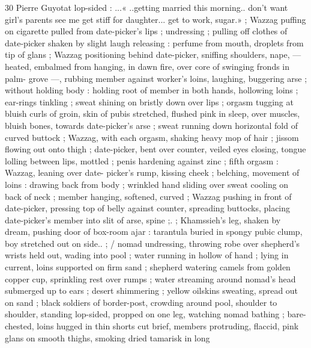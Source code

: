 30 Pierre Guyotat
lop-sided : ...« ..getting married this morning.. don’t want girl's
parents see me get stiff for daughter... get to work, sugar.» ; Wazzag
puffing on cigarette pulled from date-picker's lips ; undressing ;
pulling off clothes of date-picker shaken by slight laugh releasing :
perfume from mouth, droplets from tip of glans ; Wazzag positioning
behind date-picker, sniffing shoulders, nape, — heated, embalmed
from hanging, in dawn fire, over core of swinging fronds in palm-
grove —, rubbing member against worker's loins, laughing,
buggering arse ; without holding body : holding root of member in
both hands, hollowing loins ; ear-rings tinkling ; sweat shining on
bristly down over lips ; orgasm tugging at bluish curls of groin, skin
of pubis stretched, flushed pink in sleep, over muscles, bluish bones,
towards date-picker's arse ; sweat running down horizontal fold of
curved buttock ; Wazzag, with each orgasm, shaking heavy mop of
hair ; jissom flowing out onto thigh ; date-picker, bent over counter,
veiled eyes closing, tongue lolling between lips, mottled ; penis
hardening against zinc ; fifth orgasm : Wazzag, leaning over date-
picker's rump, kissing cheek ; belching, movement of loins : drawing
back from body ; wrinkled hand sliding over sweat cooling on back of
neck ; member hanging, softened, curved ; Wazzag pushing in front
of date-picker, pressing top of belly against counter, spreading
buttocks, placing date-picker's member into slit of arse, spine ;. ;
Khamssieh's leg, shaken by dream, pushing door of box-room ajar :
tarantula buried in spongy pubic clump, boy stretched out on side.. ;
/ nomad undressing, throwing robe over shepherd's wrists held out,
wading into pool ; water running in hollow of hand ; lying in current,
loins supported on firm sand ; shepherd watering camels from
golden copper cup, sprinkling rest over rumps ; water streaming
around nomad’s head submerged up to ears ; desert shimmering ;
yellow oilskins sweating, spread out on sand ; black soldiers of
border-post, crowding around pool, shoulder to shoulder, standing
lop-sided, propped on one leg, watching nomad bathing ; bare-
chested, loins hugged in thin shorts cut brief, members protruding,
flaccid, pink glans on smooth thighs, smoking dried tamarisk in long

